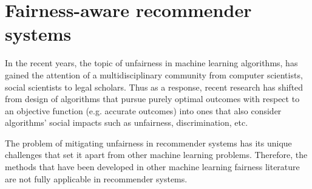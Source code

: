     
    
    
    

\section{Fairness-aware recommender systems}

In the recent years, the topic of unfairness in machine learning algorithms, has gained the attention of a multidisciplinary community from computer scientists, social scientists to legal scholars. Thus as a response, recent research has shifted from design of algorithms that pursue purely optimal outcomes with respect to an objective function (e.g. accurate outcomes) into ones that also consider algorithms' social impacts such as unfairness, discrimination, etc.

The problem of mitigating unfairness in recommender systems has its unique challenges that set it apart from other machine learning problems. Therefore, the methods that have been developed in other machine learning fairness literature are not fully applicable in recommender systems.


